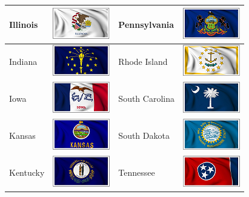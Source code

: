 \documentclass{ximera}
\begin{document}
\begin{center}
\begin{tabular}{|l|l|l|l|}
Illinois & \includegraphics{pics/StateFlags/Illinois.png} & Pennsylvania & \includegraphics{pics/StateFlags/Pennsylvania.png} \\\hline 
Indiana & \includegraphics{pics/StateFlags/Indiana.png} & Rhode Island & \includegraphics{pics/StateFlags/RhodeIsland.png} \\\hline 
Iowa & \includegraphics{pics/StateFlags/Iowa.png} & South Carolina & \includegraphics{pics/StateFlags/SouthCarolina.png} \\\hline 
Kansas & \includegraphics{pics/StateFlags/Kansas.png} & South Dakota & \includegraphics{pics/StateFlags/SouthDakota.png} \\\hline 
Kentucky & \includegraphics{pics/StateFlags/Kentucky.png} & Tennessee & \includegraphics{pics/StateFlags/Tennessee.png} \\\hline 

\end{tabular}
\end{center}
\end{document}
